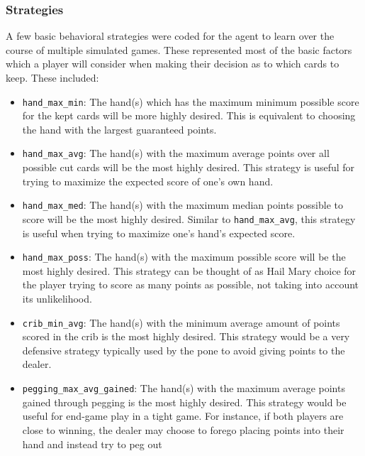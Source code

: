 
\subsubsection{Strategies}


A few basic behavioral strategies were coded for the agent to learn
over the course of multiple simulated games.
%
These represented most of the basic factors which a player will consider when
making their decision as to which cards to keep.
%
These included:
\begin{itemize}
\item \texttt{hand\_max\_min}:
	The hand(s) which has the maximum minimum possible score for the kept cards
	will be more highly desired.
	This is equivalent to choosing the hand with the largest guaranteed points.
\item \texttt{hand\_max\_avg}:
	The hand(s) with the maximum average points over all possible cut cards will
	be the most highly desired.
	This strategy is useful for trying to maximize the expected score of one's
	own hand.
\item \texttt{hand\_max\_med}:
	The hand(s) with the maximum median points possible to score will be the most
	highly desired.
	Similar to \texttt{hand\_max\_avg}, this strategy is useful when trying to
	maximize one's hand's expected score.
\item \texttt{hand\_max\_poss}:
	The hand(s) with the maximum possible score will be the most highly desired.
	This strategy can be thought of as Hail Mary choice for the player trying to
	score as many points as possible, not taking into account its unlikelihood.
\item \texttt{crib\_min\_avg}:
	The hand(s) with the minimum average amount of points scored in the crib is
	the most highly desired.
	This strategy would be a very defensive strategy typically used by the pone
	to avoid giving points to the dealer.
\item \texttt{pegging\_max\_avg\_gained}:
	The hand(s) with the maximum average points gained through pegging is the most
	highly desired.
	This strategy would be useful for end-game play in a tight game.
	For instance, if both players are close to winning, the dealer may
	choose to forego placing points into their hand and instead try to peg out

\end{itemize}
